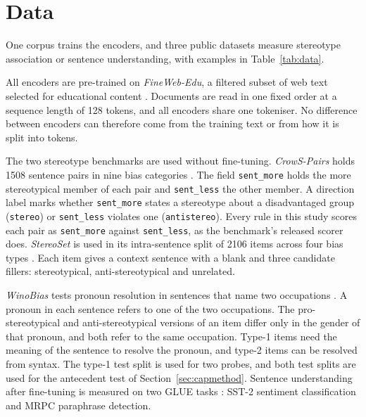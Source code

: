 \documentclass[sigconf,natbib=true]{acmart}
\begin{document}
\section{Data}
\label{sec:data}

One corpus trains the encoders, and three public datasets measure stereotype
association or sentence understanding, with examples in Table~\ref{tab:data}.

All encoders are pre-trained on \emph{FineWeb-Edu}, a filtered subset of web text
selected for educational content \citep{penedo2024fineweb}. Documents are read in
one fixed order at a sequence length of 128 tokens, and all encoders share one
tokeniser. No difference between encoders can therefore come from the training
text or from how it is split into tokens.

The two stereotype benchmarks are used without fine-tuning. \emph{CrowS-Pairs}
holds 1508 sentence pairs in nine bias categories \citep{nangia2020crows}. The
field \texttt{sent\_more} holds the more stereotypical member of each pair and
\texttt{sent\_less} the other member. A direction label marks whether
\texttt{sent\_more} states a stereotype about a disadvantaged group
(\texttt{stereo}) or \texttt{sent\_less} violates one (\texttt{antistereo}).
Every rule in this study scores each pair as \texttt{sent\_more} against
\texttt{sent\_less}, as the benchmark's released scorer does. \emph{StereoSet} is
used in its intra-sentence split of 2106 items across four bias types
\citep{nadeem2021stereoset}. Each item gives a context sentence with a blank and
three candidate fillers: stereotypical, anti-stereotypical and unrelated.

\emph{WinoBias} tests pronoun resolution in sentences that name two occupations
\citep{zhao2018winobias}. A pronoun in each sentence refers to one of the two
occupations. The pro-stereotypical and anti-stereotypical versions of an item
differ only in the gender of that pronoun, and both refer to the same
occupation. Type-1 items need the meaning of the sentence to resolve the
pronoun, and type-2 items can be resolved from syntax. The type-1 test split is
used for two probes, and both test splits are used for the antecedent test of
Section~\ref{sec:capmethod}. Sentence understanding after fine-tuning is
measured on two GLUE tasks \citep{wang2018glue}: SST-2 sentiment classification
and MRPC paraphrase detection.

\end{document}
